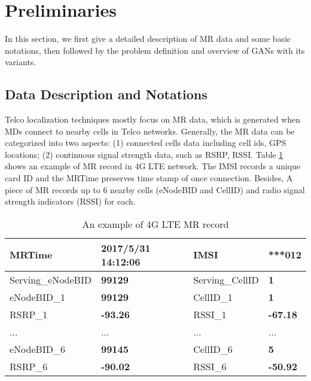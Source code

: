 \section{Preliminaries}
In this section, we first give a detailed description of MR data and some basic notations, then followed by the problem definition and overview of GANs \cite{DBLP:conf/nips/GoodfellowPMXWOCB14} with its variants.

\subsection{Data Description and Notations}
Telco localization techniques mostly focus on MR data, which is generated when MDs connect to nearby cells in Telco networks. Generally, the MR data can be categorized into two aspects: (1) connected cells data including cell ids, GPS locations; (2) continuous signal strength data, such as RSRP, RSSI. Table \ref{tab:mr} shows an example of MR record in 4G LTE network. The IMSI records a unique card ID and the MRTime preserves time stamp of once connection. Besides, A piece of MR records up to 6 nearby cells (eNodeBID and CellID) and radio signal strength indicators (RSSI) for each.



\begin{table}\scriptsize
\caption{An example of 4G LTE MR record}\label{tab:mr}
  \centering
  \begin{tabular}{|ll|ll|}
  \hline
  MRTime     &  {\textbf{2017/5/31 14:12:06}}  & IMSI & \textbf{***012}  \\ \hline
  Serving\_eNodeBID & \textbf{99129}    &   Serving\_CellID & \textbf{1} \\ \hline
  eNodeBID\_1 & \textbf{99129} &     CellID\_1 & \textbf{1}      \\ \hline
  RSRP\_1       & \textbf{-93.26} & RSSI\_1          & \textbf{-67.18}   \\ \hline
  ...      & ...                  & ...      & ...        \\ \hline
  eNodeBID\_6 & \textbf{99145}                & CellID\_6 & \textbf{5} \\ \hline
  RSRP\_6           & \textbf{-90.02} & RSSI\_6          & \textbf{-50.92}  \\ \hline
  \end{tabular}
\end{table} 